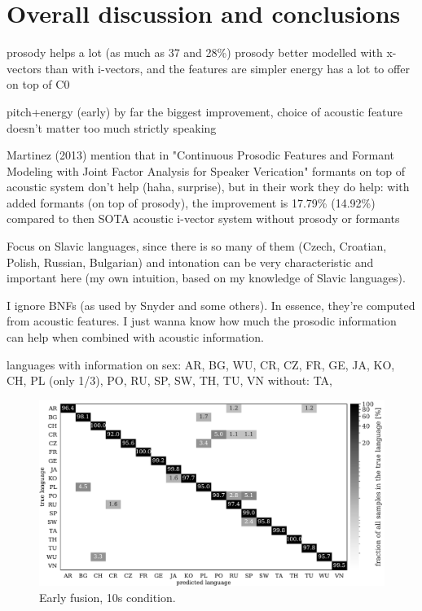 \documentclass[bsc,frontabs,twoside,singlespacing,parskip,deptreport]{infthesis}
\begin{document}
\chapter{Overall discussion and conclusions}{
  \label{chap:discussion-and-conclusions}

  prosody helps a lot (as much as 37 and 28\%)
  prosody better modelled with x-vectors than with i-vectors, and the features are simpler
  energy has a lot to offer on top of C0

  pitch+energy (early) by far the biggest improvement, choice of acoustic feature doesn't matter too much strictly speaking
  
  Martinez (2013) mention that in "Continuous Prosodic Features and Formant Modeling with Joint Factor Analysis for Speaker Verication" formants on top of acoustic system don't help (haha, surprise), but in their work they do help: with added formants (on top of prosody), the improvement is 17.79\% (14.92\%) compared to then SOTA acoustic i-vector system without prosody or formants

  Focus on Slavic languages, since there is so many of them (Czech, Croatian, Polish, Russian, Bulgarian) and intonation can be very characteristic and important here (my own intuition, based on my knowledge of Slavic languages).
  
  I ignore BNFs (as used by Snyder and some others). In essence, they're computed from acoustic features. I just wanna know how much the prosodic information can help when combined with acoustic information.

  languages with information on sex: AR, BG, WU, CR, CZ, FR, GE, JA, KO, CH, PL (only 1/3), PO, RU, SP, SW, TH, TU, VN 
  without: TA, 

  \begin{figure}[h!]
    \centering
    \includegraphics[width=\textwidth]{../img/cfmtrx_fusion_mfcc_deltas+pitch_energy.pdf}
    \caption{Early fusion, 10s condition.}
    \label{fig:summary-early-10s}
  \end{figure}

}
\end{document}
